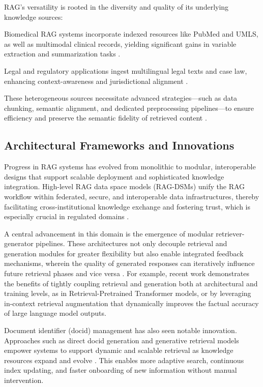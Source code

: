 \documentclass[sigconf]{acmart}
\begin{document}
RAG’s versatility is rooted in the diversity and quality of its underlying knowledge sources:

Biomedical RAG systems incorporate indexed resources like PubMed and UMLS, as well as multimodal clinical records, yielding significant gains in variable extraction and summarization tasks \cite{ref42, ref52, ref54, ref55, ref63}.

Legal and regulatory applications ingest multilingual legal texts and case law, enhancing context-awareness and jurisdictional alignment \cite{ref49, ref51, ref63}.

These heterogeneous sources necessitate advanced strategies—such as data chunking, semantic alignment, and dedicated preprocessing pipelines—to ensure efficiency and preserve the semantic fidelity of retrieved content \cite{ref52, ref54}.

\subsection{Architectural Frameworks and Innovations}

Progress in RAG systems has evolved from monolithic to modular, interoperable designs that support scalable deployment and sophisticated knowledge integration. High-level RAG data space models (RAG-DSMs) unify the RAG workflow within federated, secure, and interoperable data infrastructures, thereby facilitating cross-institutional knowledge exchange and fostering trust, which is especially crucial in regulated domains \cite{ref64}. 

A central advancement in this domain is the emergence of modular retriever-generator pipelines. These architectures not only decouple retrieval and generation modules for greater flexibility but also enable integrated feedback mechanisms, wherein the quality of generated responses can iteratively influence future retrieval phases and vice versa \cite{ref4,ref5,ref14,ref15,ref22,ref28,ref33,ref36,ref37,ref38,ref47,ref54,ref63,ref64}. For example, recent work demonstrates the benefits of tightly coupling retrieval and generation both at architectural and training levels, as in Retrieval-Pretrained Transformer models, or by leveraging in-context retrieval augmentation that dynamically improves the factual accuracy of large language model outputs.

Document identifier (docid) management has also seen notable innovation. Approaches such as direct docid generation and generative retrieval models empower systems to support dynamic and scalable retrieval as knowledge resources expand and evolve \cite{ref45,ref52,ref54}. This enables more adaptive search, continuous index updating, and faster onboarding of new information without manual intervention.
\end{document}

